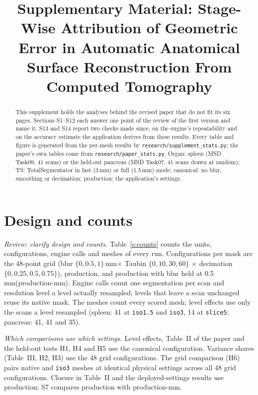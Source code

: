 \documentclass[conference]{IEEEtran}
\newcommand{\lvl}[1]{\texttt{#1}}
\newcommand{\mm}{\,mm\xspace}
\begin{document}
\title{Supplementary Material: Stage-Wise Attribution of Geometric Error in Automatic Anatomical Surface Reconstruction From Computed Tomography}

\author{
\and
{}
}

\maketitle

\begin{abstract}
This supplement holds the analyses behind the revised paper that do not fit its six pages. Sections S1--S12 each answer one point of the review of the first version and name it; S13 and S14 report two checks made since, on the engine's repeatability and on the accuracy estimate the application derives from these results. Every table and figure is generated from the per-mesh results by \texttt{research/supplement\_stats.py}; the paper's own tables come from \texttt{research/paper\_stats.py}. Organ: spleen (MSD Task09, 41 scans) or the held-out pancreas (MSD Task07, 41 scans drawn at random); TS: TotalSegmentator in fast (3\mm) or full (1.5\mm) mode; canonical: no blur, smoothing or decimation; production: the application's settings.
\end{abstract}

\section{Design and counts}
\emph{Review: clarify design and counts.} Table~\ref{s:counts} counts the units, configurations, engine calls and meshes of every run. Configurations per mask are the 48-point grid (blur $\{0,0.5,1\}$\mm $\times$ Taubin $\{0,10,30,60\}$ $\times$ decimation $\{0,0.25,0.5,0.75\}$), production, and production with blur held at 0.5\mm (production-mm). Engine calls count one segmentation per scan and resolution level a level actually resampled; levels that leave a scan unchanged reuse its native mask. The meshes count every scored mesh; level effects use only the scans a level resampled (spleen: 41 at \lvl{iso1.5} and \lvl{iso3}, 14 at \lvl{slice5}; pancreas: 41, 41 and 35).

\emph{Which comparisons use which settings.} Level effects, Table~II of the paper and the held-out tests H1, H4 and H5 use the canonical configuration. Variance shares (Table~III, H2, H3) use the 48 grid configurations. The grid comparison (H6) pairs native and \lvl{iso3} meshes at identical physical settings across all 48 grid configurations. Closure in Table~II and the deployed-settings results use production; S7 compares production with production-mm.
\end{document}
